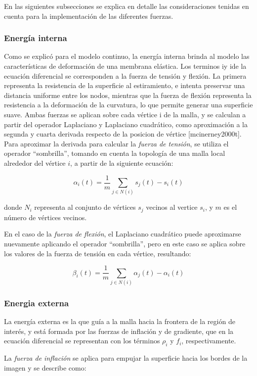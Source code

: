 En las siguientes subsecciones se explica en detalle las consideraciones tenidas en cuenta para la implementación de las diferentes fuerzas.

\subsubsection{Energía interna}\label{section:energia_interna}
Como se explicó para el modelo continuo, la energía interna brinda al modelo las características de deformación de una membrana elástica. Los terminos iy ide la ecuación diferencial se corresponden a la fuerza de tensión y flexión. La primera representa la resistencia de la superficie al estiramiento, e intenta preservar una distancia uniforme entre los nodos, mientras que la fuerza de flexión representa la resistencia a la deformación de la curvatura, lo que permite generar una superficie suave. Ambas fuerzas se aplican sobre cada vértice i de la malla, y se calculan a partir del operador Laplaciano y Laplaciano cuadrático, como aproximación a la segunda y cuarta derivada respecto de la posicion de vértice [mcinerney2000t]. Para aproximar la derivada para calcular la \emph{fuerza de tensión}, se utiliza el operador “sombrilla”, tomando en cuenta la topología de una malla local alrededor del vértice $i$, a partir de la siguiente ecuación:

$$ \alpha_{i}(t) = \dfrac{1}{m}\sum_{j\in N(i)} s_{j}(t) - s_{i}(t) $$

donde $N_{i}$ representa al conjunto de vértices $s_{j}$ vecinos al vertice $s_{i}$, y $m$ es el número de vértices  vecinos.

En el caso de la \emph{fuerza de flexión}, el Laplaciano cuadrático puede aproximarse nuevamente aplicando el operador “sombrilla”, pero en este caso se aplica sobre los valores de la fuerza de tensión en cada vértice, resultando:

$$ \beta_{i}(t) = \dfrac{1}{m} \sum_{j\in N(i)} \alpha_{j}(t) - \alpha_{i}(t)  $$

\subsubsection{Energia externa}\label{section:energia_externa}
La energía externa es la que guía a la malla hacia la frontera de la región de interés, y está formada por las fuerzas de inflación y de gradiente, que en la ecuación diferencial se representan con los términos $\rho_{i}$ y $f_{i}$, respectivamente.

La \emph{fuerza de inflación} se aplica para empujar la superficie hacia los bordes de la imagen y se describe como: 

